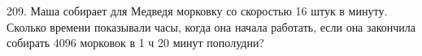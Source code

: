 209. Маша собирает для Медведя морковку со скоростью 16 штук в минуту. Сколько времени показывали часы, когда она начала работать, если она закончила собирать 4096 морковок в 1 ч 20 минут пополудни?\\
